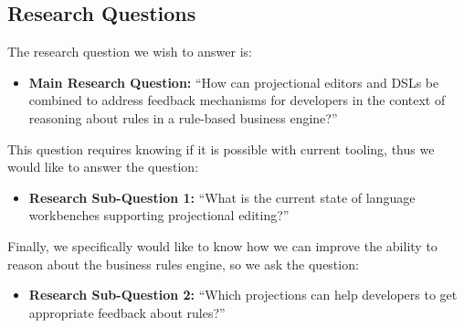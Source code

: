 \subsection{Research Questions}

The research question we wish to answer is:
\begin{itemize}
    \item \textbf{Main Research Question:} ``How can projectional editors and DSLs be combined to address feedback mechanisms for developers in the context of reasoning about rules in a rule-based business engine?''
\end{itemize}

This question requires knowing if it is possible with current tooling, thus we would like to answer the question:
\begin{itemize}
    \item \textbf{Research Sub-Question 1:} ``What is the current state of language workbenches supporting projectional editing?''
\end{itemize}

Finally, we specifically would like to know how we can improve the ability to reason about the business rules engine, so we ask the question:
\begin{itemize}
    \item \textbf{Research Sub-Question 2:} ``Which projections can help developers to get appropriate feedback about rules?''
\end{itemize}

